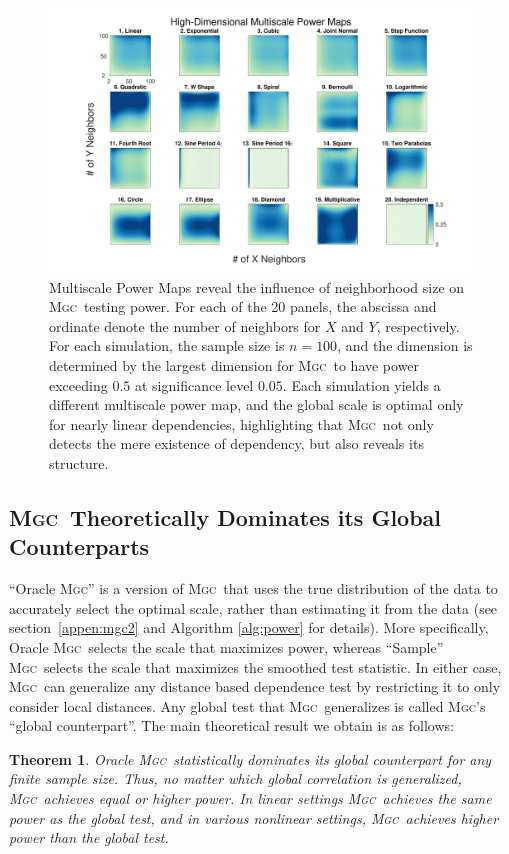 \documentclass[11pt]{article}
\providecommand{\sct}[1]{{\normalfont\textsc{#1}}}
\newcommand{\Mgc}{\sct{Mgc}}
\newtheorem{thm}{Theorem}
\begin{document}
\begin{figure}[htbp]
\includegraphics[width=1.0\textwidth,trim={3cm 0.5cm 2.5cm 0.5cm},clip]{Figures/FigHDHeat}
\caption{Multiscale Power Maps reveal the influence of neighborhood size on \Mgc~testing power.
For each of the 20 panels, the abscissa and ordinate denote the number of neighbors for $X$ and  $Y$, respectively. For each simulation, the sample size is $n=100$,  and the dimension is determined by the largest dimension for \Mgc~to have power exceeding $0.5$ at significance level $0.05$. Each simulation yields a different multiscale power map, and the global scale is optimal only for nearly linear dependencies, highlighting that \Mgc~not only detects the mere existence of dependency, but also reveals its  structure.}
\label{f:powermaps}
\end{figure}


\subsection*{\Mgc~Theoretically Dominates its Global Counterparts}
\label{s:theory}

``Oracle \Mgc'' is a version of \Mgc~that uses the true distribution of the data to accurately select the optimal scale, rather than estimating it from the data (see section~\ref{appen:mgc2} and Algorithm \ref{alg:power} for details). More specifically, Oracle \Mgc~selects the scale that maximizes power, whereas ``Sample'' \Mgc~selects the scale that maximizes the smoothed test statistic. 
In either case,  \Mgc~can generalize any distance based dependence test by restricting it to only consider local distances.  Any global test that \Mgc~generalizes is called \Mgc's ``global counterpart''.  The main theoretical result we obtain is as follows:
\begin{thm} \label{t:dominate}
Oracle \Mgc~statistically dominates its global counterpart for any finite sample size. Thus, no matter which global correlation is generalized, \Mgc~achieves equal or higher power.  In \emph{linear} settings \Mgc~achieves the same power as the global test, and in various nonlinear settings, \Mgc~achieves {higher} power than the global test. 
\end{thm}
\end{document}

